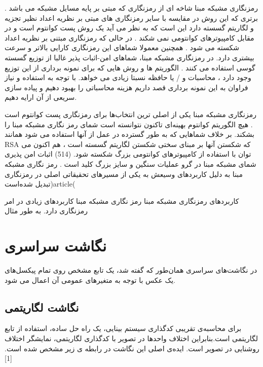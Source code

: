 

رمزنگاری مشبکه مبنا شاخه ای از رمزنگاری که مبتی بر پایه مسایل مشبکه می باشد . برتری که این روش در مقایسه با سایر رمزنگاری های مبتی بر نظریه اعداد نظیر تجزیه و لگاریتم گسسته دارد این است که به نظر می آید یک روش پست کوانتوم است و در مقابل کامپیوترهای کوانتومی نمی شکند . در حالی که رمزنگاری مبتنی بر نظریه اعداد شکسته می شود . همچنین معمولا شماهای این رمزنگاری کارایی بالاتر و سرعت بیشتری دارد.  در رمزنگاری مشبکه مبنا، شماهای امن-اثبات پذیر غالبا از توزیع گسسته گوسی استفاده می کنند . الگوریتم ها و روش هایی که برای نمونه برداری از این توزیع وجود دارد ، محاسبات و / یا حافظه نسبتا زیادی می خواهد. با توجه به استفاده و نیاز فراوان به این نمونه برداری قصد داریم هزینه محاسباتی را بهبود دهیم و پیاده سازی سریعی از آن ارایه دهیم. 


رمزنگاری مشبکه مبنا یکی از اصلی ترین انتخاب‌ها برای رمزنگاری پست کوانتوم است . هیچ الگوریتم کوانتوم بهینه‌ای تاکنون نتوانسته است شمای رمز نگاری مشبکه مبنا را بشکند. بر خلاف شماهایی که به طور گسترده در عمل از آنها استفاده می شود همانند RSA  که شکستن آنها بر مبنای سختی شکستن لگاریتم گسسته است ، هم اکنون می توان با استفاده از کامپیوترهای کوانتومی بزرگ شکسته شود. (514) اثبات امن پذیری شمای مشبکه مبنا در گرو عملیات سنگین و سایز بزرگ کلید است . 
رمز نگاری مشبکه مبنا  به دلیل کاربردهای وسیعش به یکی از مسیرهای تحقیقاتی اصلی در رمزنگاری تبدیل شده‌است)article(

کاربردهای رمزنگاری مشبکه مبنا
رمز نگاری مشبکه مبنا کاربردهای زیادی در امر رمزنگاری دارد. به طور مثال 











\section{نگاشت سراسری}

در نگاشت‌های سراسری همان‌طور که گفته شد، یک تابع مشخص روی تمام پیکسل‌های یک عکس با توجه به متغیرهای عمومی آن اعمال می شود.

\subsection{نگاشت لگاریتمی}
برای محاسبه‌ی تقریبی کدگذاری سیستم بینایی، یک راه حل ساده، استفاده از تابع لگاریتمی است.بنابراین اختلاف واحدها در تصویر با کدگذاری لگاریتمی، نمایشگر اختلاف روشنایی در تصویر است. ایده‌ی اصلی این نگاشت در رابطه ی زیر مشخص شده است. [1] 

